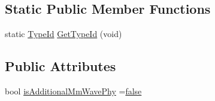 \subsection*{Static Public Member Functions}
\begin{DoxyCompactItemize}
\item 
static \hyperlink{classns3_1_1TypeId}{Type\+Id} \hyperlink{classns3_1_1MmWave3gppChannel_a63160d27a5d036e62b48eb81e374ee18}{Get\+Type\+Id} (void)
\end{DoxyCompactItemize}
\subsection*{Public Attributes}
\begin{DoxyCompactItemize}
\item 
bool \hyperlink{classns3_1_1MmWave3gppChannel_a5b921c4b6e89174bf383382c1ce6523f}{is\+Additional\+Mm\+Wave\+Phy} =\hyperlink{lte__cqi__generation_8m_ab1bef239d413c4da139c4bac92cd657a}{false}
\end{DoxyCompactItemize}
